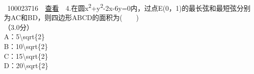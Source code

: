 \documentclass[]{article}
\begin{document}
~{{100023716}~~\href{../question/viewQuestionDetail.jsp?questionID=100023716\&testPaperId=100229072}{查看}~~4.在圆x\textsuperscript{2}+y\textsuperscript{2}-2x-6y=0内，过点E(0，1)的最长弦和最短弦分别为AC和BD，则四边形ABCD的面积为(　　)\\
\hspace*{0.333em}\hspace*{0.333em}（3.0分）\\
\hspace*{0.333em}\hspace*{0.333em}\hspace*{0.333em}\hspace*{0.333em}\hspace*{0.333em}\hspace*{0.333em}\hspace*{0.333em}\hspace*{0.333em}A：5{\textbackslash{}sqrt\{2\}}\protect\hypertarget{_baidu_bookmark_start_0}{}{‍}\\
\hspace*{0.333em}\hspace*{0.333em}\hspace*{0.333em}\hspace*{0.333em}\hspace*{0.333em}\hspace*{0.333em}\hspace*{0.333em}\hspace*{0.333em}B：10{\textbackslash{}sqrt\{2\}}\protect\hypertarget{_baidu_bookmark_start_1}{}{‍}\\
\hspace*{0.333em}\hspace*{0.333em}\hspace*{0.333em}\hspace*{0.333em}\hspace*{0.333em}\hspace*{0.333em}\hspace*{0.333em}\hspace*{0.333em}C：15{\textbackslash{}sqrt\{2\}}\protect\hypertarget{_baidu_bookmark_start_2}{}{‍}\\
\hspace*{0.333em}\hspace*{0.333em}\hspace*{0.333em}\hspace*{0.333em}\hspace*{0.333em}\hspace*{0.333em}\hspace*{0.333em}\hspace*{0.333em}D：20{\textbackslash{}sqrt\{2\}}\\
}
\end{document}
